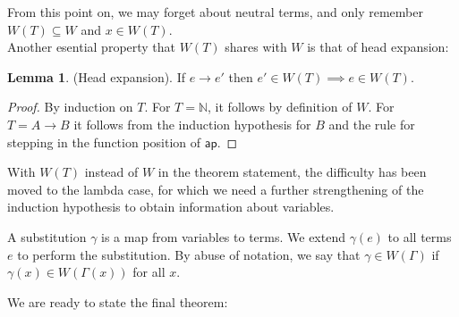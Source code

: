 \documentclass[a4paper, 11pt]{article}
\theoremstyle{definition}
\newtheorem{lemma}[theorem]{Lemma}
\newcommand{\ap}{\mathsf{ap}}
\newcommand{\G}{\Gamma}
\begin{document}
\noindent From this point on, we may forget about neutral terms, and only remember $W(T) \subseteq W$ and $x \in W(T)$. \\

Another esential property that $W(T)$ shares with $W$ is that of head expansion:

\begin{lemma} (Head expansion). If $e \to e'$ then $e' \in W(T) \implies e \in W(T)$.
\end{lemma}
\begin{proof}
  By induction on $T$. For $T = \mathbb{N}$, it follows by definition of $W$. For $T = A \to B$ it follows from the induction hypothesis for $B$ and the rule for stepping in the function position of $\ap$.
\end{proof}


With $W(T)$ instead of $W$ in the theorem statement, the difficulty has been moved to the lambda case, for which we need a further strengthening of the induction hypothesis to obtain information about variables.

A substitution $\gamma$ is a map from variables to terms. We extend $\gamma(e)$ to all terms $e$ to perform the substitution. By abuse of notation, we say that $\gamma \in W(\G)$ if $\gamma(x) \in W(\G(x))$ for all $x$.

\medskip

We are ready to state the final theorem:
\end{document}
